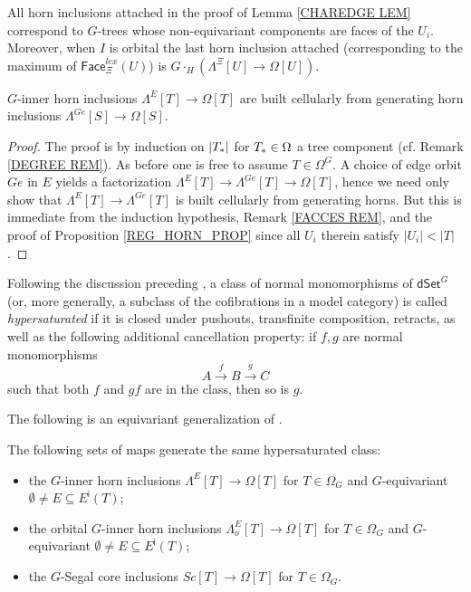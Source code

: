 \documentclass[a4paper,10pt,draft]{article}%
\begin{document}
\begin{remark}\label{FACCES REM}
All horn inclusions attached in the proof of Lemma \ref{CHAREDGE LEM} correspond to $G$-trees whose non-equivariant components are faces of the $U_i$. Moreover, when $I$ is orbital the last horn inclusion attached (corresponding to the maximum of $\mathsf{Face}^{lex}_{\Xi}(U)$) is
$G \cdot_H \left( \Lambda^{\Xi}[U] \to \Omega[U] \right)$.
\end{remark}


\begin{corollary}\label{REGGENHORN COR}
$G$-inner horn inclusions
$\Lambda^{E}[T] \to \Omega[T]$
are built cellularly from generating horn inclusions
$\Lambda^{Ge}[S] \to \Omega[S]$.
\end{corollary}

\begin{proof}
	The proof is by induction on $|T_{\**}|$ for $T_{\**}\in \Omega$ a tree component (cf. Remark \ref{DEGREE REM}). As before one is free to assume $T \in \Omega^G$.	
	A choice of edge orbit $Ge$ in $E$ yields a factorization
	$\Lambda^{E}[T] \to \Lambda^{Ge}[T] \to \Omega[T]$,
	hence we need only show that 
	$\Lambda^{E}[T] \to \Lambda^{Ge}[T]$ is built cellularly from generating horns. 
	But this is immediate from the induction hypothesis,
	Remark \ref{FACCES REM}, and the proof of Proposition \ref{REG_HORN_PROP} since all
	$U_{i}$ therein satisfy $|U_i|<|T|$.
\end{proof}


Following the discussion preceding \cite[Prop. 3.6.8]{HHM16}, 
a class of normal monomorphisms of $\mathsf{dSet}^G$
(or, more generally, a subclass of the cofibrations in a model category) is called
\textit{hypersaturated} if it is closed under
pushouts, transfinite composition, retracts,
as well as the following additional cancellation property: 
if $f,g$ are normal monomorphisms
\begin{equation}\label{CANCEL_EQ}
A \xrightarrow{f} B \xrightarrow{g} C
\end{equation}
such that both $f$ and $gf$ are in the class, then so is $g$.

The following is an equivariant generalization of 
\cite[Props. 2.4 and 2.5]{CM13a}.

\begin{proposition}\label{HYPER PROP}
The following sets of maps generate the same hypersaturated class:
\begin{itemize}
\item the $G$-inner horn inclusions
$\Lambda^{E} [T] \to \Omega[T]$ for $T \in \Omega_G$ and 
$G$-equivariant $\emptyset \neq E \subseteq E^{\mathsf{i}}(T)$; 
\item the orbital $G$-inner horn inclusions
$\Lambda^{E}_o [T] \to \Omega[T]$ for $T \in \Omega_G$ and 
$G$-equivariant $\emptyset \neq E \subseteq E^{\mathsf{i}}(T)$; 
\item the $G$-Segal core inclusions
$Sc[T] \to \Omega[T]$ for $T \in \Omega_G$.
\end{itemize}
\end{proposition}
\end{document}
